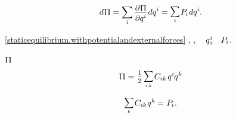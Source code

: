 \nopagebreak\vspace{-0.1em}
\begin{equation}\label{fulldifferentialoftimeindependentpotentialenergy}
d \hspace{.1ex} \potentialenergyinmechanics
= \scalebox{.95}[1]{$\displaystyle \sum_{\smash{i}}$} \hspace{.32ex}
\scalebox{.96}{$ \displaystyle \frac{\raisemath{-0.15em}{\partial \hspace{.1ex} \potentialenergyinmechanics}}{\raisemath{-0.1em}{\partial q^i}} $} \hspace{.2ex} dq^i
= \raisebox{.1em}{\scalebox{.8}[.9]{$\displaystyle \sum_{\smash{i}}$}} \hspace{.2ex} P_{\hspace{-0.1ex}i} \hspace{.2ex} dq^i
\hspace{-0.1ex} .
\end{equation}

\vspace{-0.5em}%
{}~\eqref{staticequilibrium.withpotentialandexternalforces}
,
,
\href{https://en.wikipedia.org/wiki/Mechanical_equilibrium}{}~%
${q_{\circ}^{\hspace{.1ex}i}}$
~${P_{\hspace{-0.1ex}i}}$.

~$\potentialenergyinmechanics$
%
\begin{equation}\label{potentialenergyinmechanics.as.stiffnessbycoordinates}
\potentialenergyinmechanics = \hspace{.1ex} \raisebox{.1em}{\smalldisplaystyleonehalf \hspace{-0.4ex} \scalebox{.8}[.9]{$\displaystyle \sum_{\smash{i,k}}$}} \hspace{.2ex} C_{ik} \hspace{.25ex} q^{i} \hspace{-0.1ex} q^{k}
\end{equation}

\nopagebreak\vspace{-1.25em}
\begin{equation}\label{staticequilibrium.lineardiscretesystem}
\raisebox{.1em}{\scalebox{.8}[.9]{$\displaystyle \sum_{\smash{k}}$}} \hspace{.2ex} C_{ik} \hspace{.12ex} q^k \hspace{-0.1ex}
= \hspace{.1ex} P_{\hspace{-0.1ex}i} \hspace{.1ex} .
\vspace{-0.1em}\end{equation}

